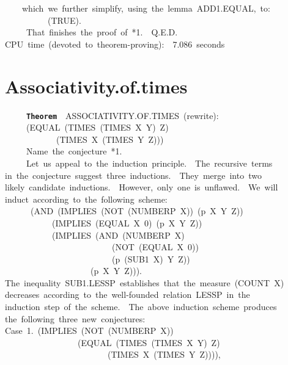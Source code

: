 \documentclass[11pt]{book}
\newenvironment{pubasis}{\begin{flushleft}\ttfamily\small}{\normalsize\rmfamily\end{flushleft}}
\newcommand{\axiomordefinition}[1]{\vspace{6pt}\texttt{\textbf{#1}}}
\newcommand{\pubdefaulttextsize}{\large}
\begin{document}
\begin{pubasis}
~~~~which~we~further~simplify,~using~the~lemma~ADD1.EQUAL,~to:\\

~~~~~~~~~~(TRUE).\\

~~~~~That~finishes~the~proof~of~*1.~~Q.E.D.\\

CPU~time~(devoted~to~theorem-proving):~~7.086~seconds\\
\end{pubasis}
\section{Associativity.of.times}
\pubdefaulttextsize
\begin{pubasis}
~~~~~\axiomordefinition{Theorem}~~ASSOC\-IATIV\-ITY.OF.TIMES~(rewrite):\\
~~~~~(EQUAL~(TIMES~(TIMES~X~Y)~Z)\\
~~~~~~~~~~~~(TIMES~X~(TIMES~Y~Z)))\\

~~~~~Name~the~conjecture~*1.\\

~~~~~Let~us~appeal~to~the~induction~principle.~~The~recursive~terms\\
in~the~conjecture~suggest~three~inductions.~~They~merge~into~two\\
likely~candidate~inductions.~~However,~only~one~is~unflawed.~~We~will\\
induct~according~to~the~following~scheme:\\
~~~~~~(AND~(IMPLIES~(NOT~(NUMBERP~X))~(p~X~Y~Z))\\
~~~~~~~~~~~(IMPLIES~(EQUAL~X~0)~(p~X~Y~Z))\\
~~~~~~~~~~~(IMPLIES~(AND~(NUMBERP~X)\\
~~~~~~~~~~~~~~~~~~~~~~~~~(NOT~(EQUAL~X~0))\\
~~~~~~~~~~~~~~~~~~~~~~~~~(p~(SUB1~X)~Y~Z))\\
~~~~~~~~~~~~~~~~~~~~(p~X~Y~Z))).\\
The~inequality~SUB1.LESSP~establishes~that~the~measure~(COUNT~X)\\
decreases~according~to~the~well-founded~relation~LESSP~in~the\\
induction~step~of~the~scheme.~~The~above~induction~scheme~produces\\
the~following~three~new~conjectures:\\

Case~1.~(IMPLIES~(NOT~(NUMBERP~X))\\
~~~~~~~~~~~~~~~~~(EQUAL~(TIMES~(TIMES~X~Y)~Z)\\
~~~~~~~~~~~~~~~~~~~~~~~~(TIMES~X~(TIMES~Y~Z)))),\\


\end{pubasis}
\end{document}
